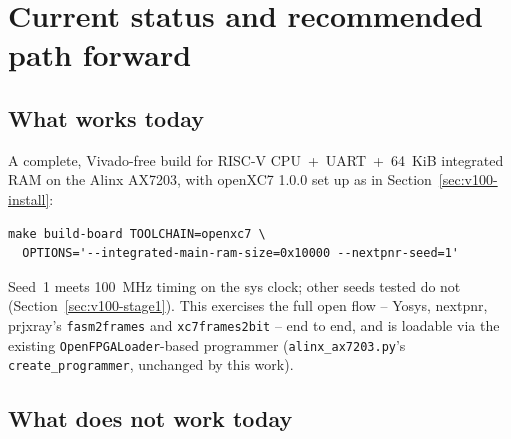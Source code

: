 \documentclass[11pt]{article}
\begin{document}
\section{Current status and recommended path forward}
\label{sec:status}

\subsection{What works today}

A complete, Vivado-free build for RISC-V CPU~+~UART~+~64~KiB integrated
RAM on the Alinx AX7203, with openXC7 1.0.0 set up as in
Section~\ref{sec:v100-install}:
\begin{lstlisting}[style=termout]
make build-board TOOLCHAIN=openxc7 \
  OPTIONS='--integrated-main-ram-size=0x10000 --nextpnr-seed=1'
\end{lstlisting}
Seed~1 meets 100~MHz timing on the sys clock; other seeds tested do not
(Section~\ref{sec:v100-stage1}).
This exercises the full open flow -- Yosys, nextpnr, prjxray's
\lstinline{fasm2frames} and \lstinline{xc7frames2bit} -- end to end, and
is loadable via the existing \lstinline{OpenFPGALoader}-based programmer
(\lstinline{alinx_ax7203.py}'s \lstinline{create_programmer}, unchanged by
this work).

\subsection{What does not work today}
\end{document}
